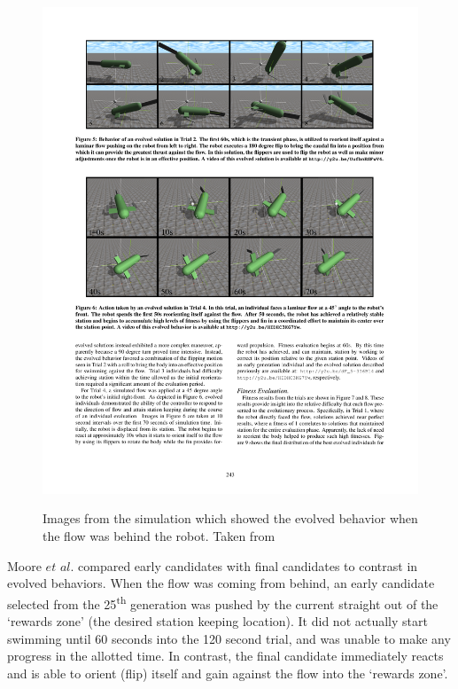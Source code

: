 \documentclass{sig-alternate}
\begin{document}
\begin{figure}%
\center
\caption{Images from the simulation which showed the evolved behavior when the flow was behind the robot. Taken from \cite{Moore:2013:ESK:2463372.2463402}}

  \includegraphics[scale=.65]{sr1}
\label{fig:robot flip}
\end{figure}

  Moore $et$ $al.$ compared early candidates with final candidates to contrast in evolved behaviors. When the flow was coming from behind, an early candidate selected from the 25\textsuperscript{th} generation was pushed by the current straight out of the `rewards zone' (the desired station keeping location). It did not actually start swimming until 60 seconds into the 120 second trial, and was unable to make any progress in the allotted time. In contrast, the final candidate immediately reacts and is able to orient (flip) itself and gain against the flow into the `rewards zone'. 
\end{document}
